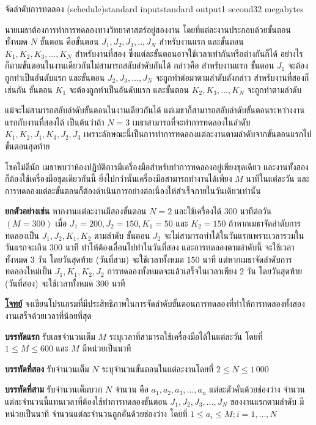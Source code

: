 \documentclass[11pt,a4paper]{article}
\begin{document}
\begin{problem}{จัดลำดับการทดลอง (schedule)}{standard input}{standard output}{1 second}{32 megabytes}

นายเมธาต้องการทำการทดลองทางวิทยาศาสตร์อยู่สองงาน โดยที่แต่ละงานประกอบด้วยขั้นตอนทั้งหมด $N$ ขั้นตอน คือขั้นตอน  $J_1,J_2,J_3,..,J_N$ สำหรับงานแรก และขั้นตอน $K_1,K_2,K_3,...,K_N$ สำหรับงานที่สอง ซึ่งแต่ละขั้นตอนอาจใช้เวลาเท่ากันหรือต่างกันก็ได้ อย่างไรก็ตามขั้นตอนในงานเดียวกันไม่สามารถสลับลำดับกันได้ กล่าวคือ สำหรับงานแรก ขั้นตอน $J_1$ จะต้องถูกทำเป็นอันดับแรก และขั้นตอน $J_2,J_3,...,J_N$ จะถูกทำต่อมาตามลำดับดังกล่าว สำหรับงานที่สองก็เช่นกัน ขั้นตอน $K_1$ จะต้องถูกทำเป็นอันดับแรก และขั้นตอน $K_2,K_3,...,K_N$ จะถูกทำตามลำดับ

แม้จะไม่สามารถสลับลำดับขั้นตอนในงานเดียวกันได้ แต่เมธาก็สามารถสลับลำดับขั้นตอนระหว่างงานแรกกับงานที่สองได้ เป็นต้นว่าถ้า $N=3$ เมธาสามารถที่จะทำการทดลองในลำดับ $K_1,K_2,J_1,K_3,J_2,J_3$ เพราะลักษณะนี้เป็นการทำการทดลองแต่ละงานตามลำดับจากขั้นตอนแรกไปขั้นตอนสุดท้าย

โชคไม่ดีนัก เมธาพบว่าห้องปฏิบัติการมีเครื่องมือสำหรับทำการทดลองอยู่เพียงชุดเดียว และงานทั้งสองก็ต้องใช้เครื่องมือชุดเดียวกันนี้  ยิ่งไปกว่านั้นเครื่องมือสามารถทำงานได้เพียง $M$ นาทีในแต่ละวัน และการทดลองแต่ละขั้นตอนก็ต้องดำเนินการอย่างต่อเนื่องให้สำเร็จภายในวันเดียวเท่านั้น

\textbf{ยกตัวอย่างเช่น} หากงานแต่ละงานมีสองขั้นตอน $N=2$ และใช้เครื่องได้ $300$ นาทีต่อวัน $(M=300)$ เมื่อ $J_1=200, J_2=150, K_1=50$ และ $K_2=150$ ถ้าหากเมธาจัดลำดับการทดลองเป็น $J_1,J_2,K_1,K_2$ ตามลำดับ ขั้นตอน $J_2$ จะไม่สามารถทำได้ในวันแรกเพราะเวลารวมในวันแรกจะเกิน $300$ นาที ทำให้ต้องเลื่อนไปทำในวันที่สอง และการทดลองตามลำดับนี้ จะใช้เวลาทั้งหมด $3$ วัน โดยวันสุดท้าย (วันที่สาม) จะใช้เวลาทั้งหมด $150$ นาที แต่หากเมธาจัดลำดับการทดลองใหม่เป็น $J_1,K_1,K_2,J_2$ การทดลองทั้งหมดจะแล้วเสร็จในเวลาเพียง $2$ วัน โดยวันสุดท้าย (วันที่สอง) จะใช้เวลาทั้งหมด $300$ นาที


\bigskip
\underline{\textbf{โจทย์}}  จงเขียนโปรแกรมที่มีประสิทธิภาพในการจัดลำดับขั้นตอนการทดลองที่ทำให้การทดลองทั้งสองงานเสร็จด้วยเวลาที่น้อยที่สุด


\InputFile

\textbf{บรรทัดแรก} รับเลขจำนวนเต็ม $M$ ระบุเวลาที่สามารถใช้เครื่องมือได้ในแต่ละวัน
โดยที่ $1 \leq M \leq 600$ และ $M$ มีหน่วยเป็นนาที

\textbf{บรรทัดที่สอง} รับจำนวนเต็ม $N$ ระบุจำนวนขั้นตอนในแต่ละงานโดยที่ $2 \leq N \leq 1\,000$

\textbf{บรรทัดที่สาม} รับจำนวนเต็มบวก $N$ จำนวน คือ $a_1,a_2,a_3,...,a_n$ แต่ละตัวคั่นด้วยช่องว่าง จำนวนแต่ละจำนวนนี้แทนเวลาที่ต้องใช้ทำการทดลองขั้นตอน $J_1,J_2,J_3,...,J_N$ ของงานแรกตามลำดับ มีหน่วยเป็นนาที จำนวนแต่ละจำนวนถูกคั่นด้วยช่องว่าง โดยที่ $1 \leq a_i \leq M; i = 1,...,N$


\end{problem}
\end{document}
